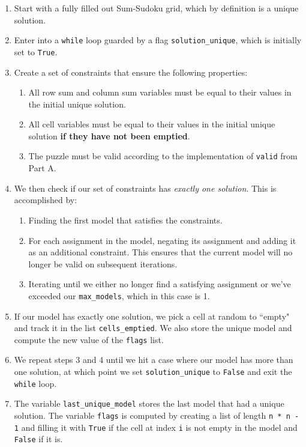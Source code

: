 \documentclass{article}
\newcommand{\code}[1]{\texttt{#1}}
\begin{document}
\begin{enumerate}
  \item Start with a fully filled out Sum-Sudoku grid, which by definition is a unique solution.
  \item Enter into a \code{while} loop guarded by a flag \code{solution\_unique}, which is initially set to \code{True}.
  \item Create a set of constraints that ensure the following properties:
  \begin{enumerate}
    \item All row sum and column sum variables must be equal to their values in the initial unique solution.
    \item All cell variables must be equal to their values in the initial unique solution \textbf{if they have not been emptied}.
    \item The puzzle must be valid according to the implementation of \code{valid} from Part A.
  \end{enumerate}
  \item We then check if our set of constraints has \emph{exactly one solution}. This is accomplished by:
  \begin{enumerate}
    \item Finding the first model that satisfies the constraints.
    \item For each assignment in the model, negating its assignment and adding it as an additional constraint. This ensures that the current model will no longer be valid on subsequent iterations.
    \item Iterating until we either no longer find a satisfying assignment or we've exceeded our \code{max\_models}, which in this case is 1.
  \end{enumerate}
  \item If our model has exactly one solution, we pick a cell at random to ``empty" and track it in the list \code{cells\_emptied}. We also store the unique model and compute the new value of the \code{flags} list.
  \item We repeat steps 3 and 4 until we hit a case where our model has more than one solution, at which point we set \code{solution\_unique} to \code{False} and exit the \code{while} loop.
  \item The variable \code{last\_unique\_model} stores the last model that had a unique solution. The variable \code{flags} is computed by creating a list of length \code{n * n - 1} and filling it with \code{True} if the cell at index \code{i} is not empty in the model and \code{False} if it is.
\end{enumerate}
\end{document}
